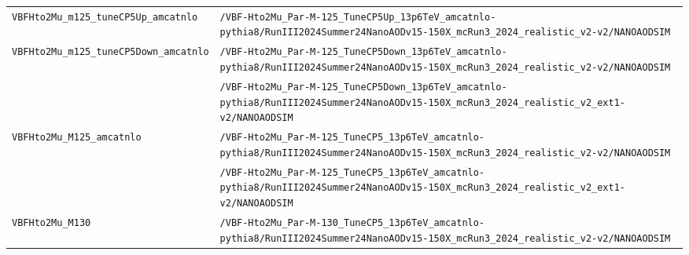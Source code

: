 \begin{longtable}{@{}>{\RaggedRight\arraybackslash}p{} >{\RaggedRight\arraybackslash}p{}@{}}
\addlinespace[2pt]
\texttt{VBFHto2Mu\_\allowbreak{}m125\_\allowbreak{}tuneCP5Up\_\allowbreak{}amcatnlo} & \texttt{/\allowbreak{}VBF-\allowbreak{}Hto2Mu\_\allowbreak{}Par-\allowbreak{}M-\allowbreak{}125\_\allowbreak{}TuneCP5Up\_\allowbreak{}13p6TeV\_\allowbreak{}amcatnlo-\allowbreak{}pythia8/\allowbreak{}RunIII2024Summer24NanoAODv15-\allowbreak{}150X\_\allowbreak{}mcRun3\_\allowbreak{}2024\_\allowbreak{}realistic\_\allowbreak{}v2-\allowbreak{}v2/\allowbreak{}NANOAODSIM} \\
\addlinespace[2pt]
\texttt{VBFHto2Mu\_\allowbreak{}m125\_\allowbreak{}tuneCP5Down\_\allowbreak{}amcatnlo} & \texttt{/\allowbreak{}VBF-\allowbreak{}Hto2Mu\_\allowbreak{}Par-\allowbreak{}M-\allowbreak{}125\_\allowbreak{}TuneCP5Down\_\allowbreak{}13p6TeV\_\allowbreak{}amcatnlo-\allowbreak{}pythia8/\allowbreak{}RunIII2024Summer24NanoAODv15-\allowbreak{}150X\_\allowbreak{}mcRun3\_\allowbreak{}2024\_\allowbreak{}realistic\_\allowbreak{}v2-\allowbreak{}v2/\allowbreak{}NANOAODSIM} \\
 & \texttt{/\allowbreak{}VBF-\allowbreak{}Hto2Mu\_\allowbreak{}Par-\allowbreak{}M-\allowbreak{}125\_\allowbreak{}TuneCP5Down\_\allowbreak{}13p6TeV\_\allowbreak{}amcatnlo-\allowbreak{}pythia8/\allowbreak{}RunIII2024Summer24NanoAODv15-\allowbreak{}150X\_\allowbreak{}mcRun3\_\allowbreak{}2024\_\allowbreak{}realistic\_\allowbreak{}v2\_\allowbreak{}ext1-\allowbreak{}v2/\allowbreak{}NANOAODSIM} \\
\addlinespace[2pt]
\texttt{VBFHto2Mu\_\allowbreak{}M125\_\allowbreak{}amcatnlo} & \texttt{/\allowbreak{}VBF-\allowbreak{}Hto2Mu\_\allowbreak{}Par-\allowbreak{}M-\allowbreak{}125\_\allowbreak{}TuneCP5\_\allowbreak{}13p6TeV\_\allowbreak{}amcatnlo-\allowbreak{}pythia8/\allowbreak{}RunIII2024Summer24NanoAODv15-\allowbreak{}150X\_\allowbreak{}mcRun3\_\allowbreak{}2024\_\allowbreak{}realistic\_\allowbreak{}v2-\allowbreak{}v2/\allowbreak{}NANOAODSIM} \\
 & \texttt{/\allowbreak{}VBF-\allowbreak{}Hto2Mu\_\allowbreak{}Par-\allowbreak{}M-\allowbreak{}125\_\allowbreak{}TuneCP5\_\allowbreak{}13p6TeV\_\allowbreak{}amcatnlo-\allowbreak{}pythia8/\allowbreak{}RunIII2024Summer24NanoAODv15-\allowbreak{}150X\_\allowbreak{}mcRun3\_\allowbreak{}2024\_\allowbreak{}realistic\_\allowbreak{}v2\_\allowbreak{}ext1-\allowbreak{}v2/\allowbreak{}NANOAODSIM} \\
\addlinespace[2pt]
\texttt{VBFHto2Mu\_\allowbreak{}M130} & \texttt{/\allowbreak{}VBF-\allowbreak{}Hto2Mu\_\allowbreak{}Par-\allowbreak{}M-\allowbreak{}130\_\allowbreak{}TuneCP5\_\allowbreak{}13p6TeV\_\allowbreak{}amcatnlo-\allowbreak{}pythia8/\allowbreak{}RunIII2024Summer24NanoAODv15-\allowbreak{}150X\_\allowbreak{}mcRun3\_\allowbreak{}2024\_\allowbreak{}realistic\_\allowbreak{}v2-\allowbreak{}v2/\allowbreak{}NANOAODSIM} \\

\end{longtable}
